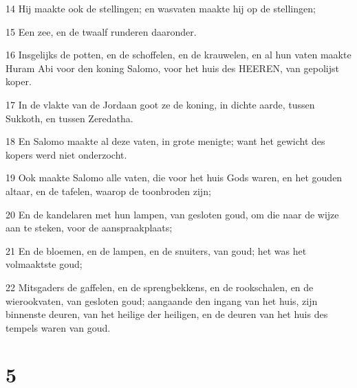 \par 14 Hij maakte ook de stellingen; en wasvaten maakte hij op de stellingen;
\par 15 Een zee, en de twaalf runderen daaronder.
\par 16 Insgelijks de potten, en de schoffelen, en de krauwelen, en al hun vaten maakte Huram Abi voor den koning Salomo, voor het huis des HEEREN, van gepolijst koper.
\par 17 In de vlakte van de Jordaan goot ze de koning, in dichte aarde, tussen Sukkoth, en tussen Zeredatha.
\par 18 En Salomo maakte al deze vaten, in grote menigte; want het gewicht des kopers werd niet onderzocht.
\par 19 Ook maakte Salomo alle vaten, die voor het huis Gods waren, en het gouden altaar, en de tafelen, waarop de toonbroden zijn;
\par 20 En de kandelaren met hun lampen, van gesloten goud, om die naar de wijze aan te steken, voor de aanspraakplaats;
\par 21 En de bloemen, en de lampen, en de snuiters, van goud; het was het volmaaktste goud;
\par 22 Mitsgaders de gaffelen, en de sprengbekkens, en de rookschalen, en de wierookvaten, van gesloten goud; aangaande den ingang van het huis, zijn binnenste deuren, van het heilige der heiligen, en de deuren van het huis des tempels waren van goud.

\chapter{5}


